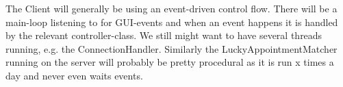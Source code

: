 The Client will generally be using an event-driven control flow. There will be a main-loop listening to for GUI-events and when an event happens it is handled by the relevant controller-class. We still might want to have several threads running, e.g. the ConnectionHandler. Similarly the LuckyAppointmentMatcher running on the server will probably be pretty procedural as it is run x times a day and never even waits events.
